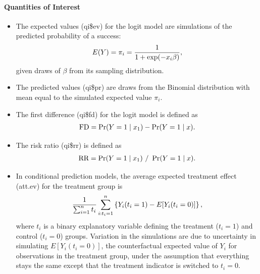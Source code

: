 \documentclass[letterpaper,10pt,english]{sphinxmanual}
\begin{document}
\paragraph{Quantities of Interest}
\label{zelig-logit:quantities-of-interest}\begin{itemize}
\item {} 
The expected values (qi\$ev) for the logit model are simulations of
the predicted probability of a success:
\begin{gather}
\begin{split}E(Y) =
  \pi_i= \frac{1}{1 + \exp(-x_i \beta)},\end{split}\notag
\end{gather}
given draws of \(\beta\) from its sampling distribution.

\item {} 
The predicted values (qi\$pr) are draws from the Binomial distribution
with mean equal to the simulated expected value \(\pi_i\).

\item {} 
The first difference (qi\$fd) for the logit model is defined as
\begin{gather}
\begin{split}\textrm{FD} = \Pr(Y = 1 \mid x_1) - \Pr(Y = 1 \mid x).\end{split}\notag
\end{gather}
\item {} 
The risk ratio (qi\$rr) is defined as
\begin{gather}
\begin{split}\textrm{RR} = \Pr(Y = 1 \mid x_1) \ / \ \Pr(Y = 1 \mid x).\end{split}\notag
\end{gather}
\item {} 
In conditional prediction models, the average expected treatment
effect (att.ev) for the treatment group is
\begin{gather}
\begin{split}\frac{1}{\sum_{i=1}^n t_i}\sum_{i:t_i=1}^n \left\{ Y_i(t_i=1) -
      E[Y_i(t_i=0)] \right\},\end{split}\notag
\end{gather}
where \(t_i\) is a binary explanatory variable defining the
treatment (\(t_i=1\)) and control (\(t_i=0\)) groups.
Variation in the simulations are due to uncertainty in simulating
\(E[Y_i(t_i=0)]\), the counterfactual expected value of
\(Y_i\) for observations in the treatment group, under the
assumption that everything stays the same except that the treatment
indicator is switched to \(t_i=0\).


\end{itemize}
\end{document}
